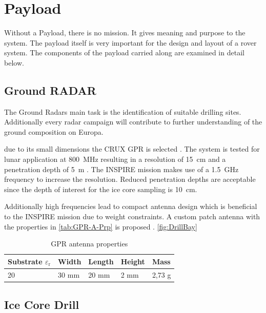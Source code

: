 
\chapter{Payload}
\label{chap:payload}

Without a Payload, there is no mission. It gives meaning and purpose to the system. The payload itself is very important for the design and layout of a rover system. The components of the payload carried along are examined in detail below. 

\section{Ground RADAR}
The Ground Radars main task is the identification of suitable drilling sites. Additionally every radar campaign will contribute to further understanding of the ground composition on Europa.

due to its small dimensions the CRUX GPR is selected . The system is tested for lunar application at 800~MHz resulting in a resolution of 15~cm and a penetration depth of 5~m \cite{CRUX_GPR}. The INSPIRE mission makes use of a 1.5~GHz frequency to increase the resolution. 
Reduced penetration depths are acceptable since the depth of interest for the ice core sampling is 10~cm.

Additionally high frequencies lead to compact antenna design which is beneficial to the INSPIRE mission due to weight constraints. 
A custom patch antenna with the properties in \autoref{tab:GPR-A-Prp} is proposed \cite{patch_ant_GPR}\cite{Patch_Ant_design}. \autoref{fig:DrillBay}

\begin{table}[h]
\centering
\begin{tabular}{lllll}
\toprule
Substrate ${\varepsilon}_\text{r}$ & Width & Length & Height & Mass   \\
\midrule
20                         & 30 mm & 20 mm  & 2 mm   & 2,73 g  \\
\bottomrule
\end{tabular}
\caption{GPR antenna properties \cite{Patch_Ant_design}}
\label{tab:GPR-A-Prp}
\end{table}

\section{Ice Core Drill}

